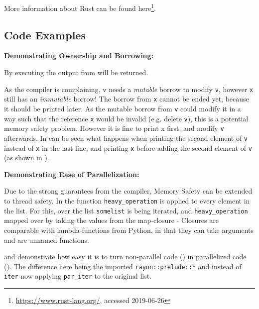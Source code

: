 More information about Rust can be found
here\footnote{\url{https://www.rust-lang.org/}, accessed 2019-06-26}.




\newpage
\subsection{Code Examples}\label{sec:examples}

\textbf{Demonstrating Ownership and Borrowing:}

By executing  the output from  will be returned.



As the compiler is complaining, v needs a {\em mutable} borrow to modify
\verb|v|, however \verb|x| still has an {\em immutable} borrow! The borrow from
\verb|x| cannot be ended yet, because it should be printed later. As the mutable
borrow from \verb|v| could modify it in a way such that the reference \verb|x|
would be invalid (e.g. delete \verb|v|), this is a potential memory safety problem.
However it is fine to print x first, and modify \verb|v| afterwards. In
 can be seen what happens when printing the second element of
\verb|v| instead of \verb|x| in the last line, and printing \verb|x| before
adding the second element of \verb|v| (as shown in ).



\newpage
\textbf{Demonstrating Ease of Parallelization:}

Due to the strong guarantees from the compiler, Memory Safety can be extended
to thread safety. In  the function \verb|heavy_operation| is
applied to every element in the list. For this, over the list \verb|somelist|
is being iterated, and \verb|heavy_operation| mapped over by taking the values
from the map-closure - Closures are comparable with lambda-functions from
Python, in that they can take arguments and are unnamed functions.

 and  demonstrate how easy it is to turn
non-parallel code () in parallelized code ().
The difference here being the imported \verb|rayon::prelude::*| and instead of
\verb|iter| now applying \verb|par_iter| to the original list.


